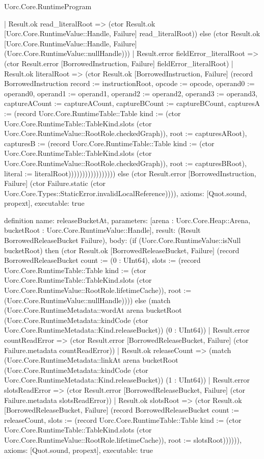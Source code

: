 \begin{lexlean}{Uorc.Core.RuntimeProgram}
\begin{semanticmodule}
{                                | Result.ok read_literalRoot => (ctor Result.ok [Uorc.Core.RuntimeValue::Handle, Failure] read_literalRoot)) else (ctor Result.ok [Uorc.Core.RuntimeValue::Handle, Failure] (Uorc.Core.RuntimeValue::nullHandle)))
                              | Result.error fieldError_literalRoot => (ctor Result.error [BorrowedInstruction, Failure] fieldError_literalRoot)
                              | Result.ok literalRoot => (ctor Result.ok [BorrowedInstruction, Failure] (record BorrowedInstruction {record := instructionRoot, opcode := opcode, operand0 := operand0, operand1 := operand1, operand2 := operand2, operand3 := operand3, captureACount := captureACount, captureBCount := captureBCount, capturesA := (record Uorc.Core.RuntimeTable::Table {kind := (ctor Uorc.Core.RuntimeTable::TableKind.slots (ctor Uorc.Core.RuntimeValue::RootRole.checkedGraph)), root := capturesARoot}), capturesB := (record Uorc.Core.RuntimeTable::Table {kind := (ctor Uorc.Core.RuntimeTable::TableKind.slots (ctor Uorc.Core.RuntimeValue::RootRole.checkedGraph)), root := capturesBRoot}), literal := literalRoot}))))))))))))))))) else (ctor Result.error [BorrowedInstruction, Failure] (ctor Failure.static (ctor Uorc.Core.Types::StaticError.invalidLocalReference)))),
  axioms: [Quot.sound, propext],
  executable: true
}

definition{
  name: releaseBucketAt,
  parameters: [arena : Uorc.Core.Heap::Arena, bucketRoot : Uorc.Core.RuntimeValue::Handle],
  result: (Result BorrowedReleaseBucket Failure),
  body: (if (Uorc.Core.RuntimeValue::isNull bucketRoot) then (ctor Result.ok [BorrowedReleaseBucket, Failure] (record BorrowedReleaseBucket {count := (0 : UInt64), slots := (record Uorc.Core.RuntimeTable::Table {kind := (ctor Uorc.Core.RuntimeTable::TableKind.slots (ctor Uorc.Core.RuntimeValue::RootRole.lifetimeCache)), root := (Uorc.Core.RuntimeValue::nullHandle)})})) else (match (Uorc.Core.RuntimeMetadata::wordAt arena bucketRoot (Uorc.Core.RuntimeMetadata::kindCode (ctor Uorc.Core.RuntimeMetadata::Kind.releaseBucket)) (0 : UInt64))
    | Result.error countReadError => (ctor Result.error [BorrowedReleaseBucket, Failure] (ctor Failure.metadata countReadError))
    | Result.ok releaseCount => (match (Uorc.Core.RuntimeMetadata::linkAt arena bucketRoot (Uorc.Core.RuntimeMetadata::kindCode (ctor Uorc.Core.RuntimeMetadata::Kind.releaseBucket)) (1 : UInt64))
      | Result.error slotsReadError => (ctor Result.error [BorrowedReleaseBucket, Failure] (ctor Failure.metadata slotsReadError))
      | Result.ok slotsRoot => (ctor Result.ok [BorrowedReleaseBucket, Failure] (record BorrowedReleaseBucket {count := releaseCount, slots := (record Uorc.Core.RuntimeTable::Table {kind := (ctor Uorc.Core.RuntimeTable::TableKind.slots (ctor Uorc.Core.RuntimeValue::RootRole.lifetimeCache)), root := slotsRoot})}))))),
  axioms: [Quot.sound, propext],
  executable: true
}


\end{semanticmodule}
\end{lexlean}

